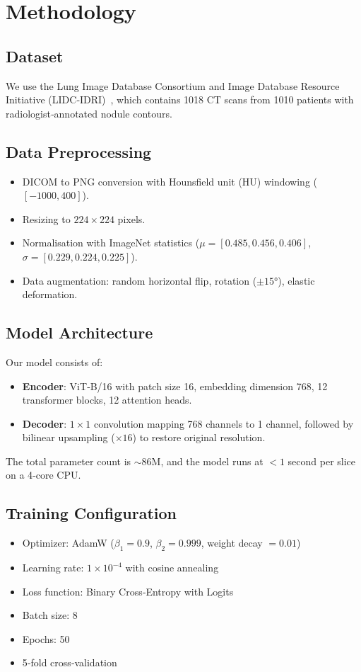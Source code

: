 \documentclass[conference]{IEEEtran}
\begin{document}
\section{Methodology}

\subsection{Dataset}
We use the Lung Image Database Consortium and Image Database Resource Initiative (LIDC‑IDRI)~\cite{armato2011}, which contains 1018 CT scans from 1010 patients with radiologist‑annotated nodule contours.

\subsection{Data Preprocessing}
\begin{itemize}
    \item DICOM to PNG conversion with Hounsfield unit (HU) windowing ($[-1000, 400]$).
    \item Resizing to $224 \times 224$ pixels.
    \item Normalisation with ImageNet statistics ($\mu = [0.485, 0.456, 0.406]$, $\sigma = [0.229, 0.224, 0.225]$).
    \item Data augmentation: random horizontal flip, rotation ($\pm 15°$), elastic deformation.
\end{itemize}

\subsection{Model Architecture}
Our model consists of:
\begin{itemize}
    \item \textbf{Encoder}: ViT‑B/16 with patch size 16, embedding dimension 768, 12 transformer blocks, 12 attention heads.
    \item \textbf{Decoder}: $1 \times 1$ convolution mapping 768 channels to 1 channel, followed by bilinear upsampling ($\times 16$) to restore original resolution.
\end{itemize}

The total parameter count is $\sim$86M, and the model runs at $<\!1$ second per slice on a 4‑core CPU.

\subsection{Training Configuration}
\begin{itemize}
    \item Optimizer: AdamW ($\beta_1 = 0.9$, $\beta_2 = 0.999$, weight decay $= 0.01$)
    \item Learning rate: $1 \times 10^{-4}$ with cosine annealing
    \item Loss function: Binary Cross‑Entropy with Logits
    \item Batch size: 8
    \item Epochs: 50
    \item 5‑fold cross‑validation
\end{itemize}
\end{document}
